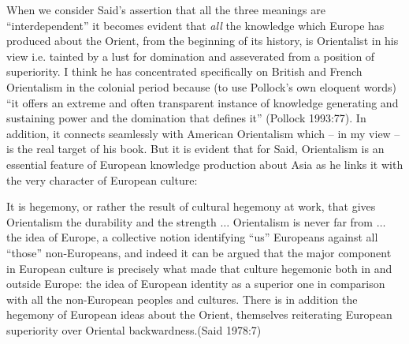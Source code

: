 When we consider Said’s assertion that all the three meanings are “interdependent” it becomes evident that {\sl all} the knowledge which Europe has produced about the Orient, from the beginning of its history, is Orientalist in his view i.e. tainted by a lust for domination and asseverated from a position of superiority. I think he has concentrated specifically on British and French Orientalism in the colonial period because (to use Pollock’s own eloquent words) “it offers an extreme and often transparent instance of knowledge generating and sustaining power and the domination that defines it” (Pollock 1993:77). In addition, it connects seamlessly with American Orientalism which – in my view – is the real target of his book. But it is evident that for Said, Orientalism is an essential feature of European knowledge production about Asia as he links it with the very character of European culture:
\begin{myquote}
It is hegemony, or rather the result of cultural hegemony at work, that gives Orientalism the durability and the strength $\ldots$ Orientalism is never far from $\ldots$ the idea of Europe, a collective notion identifying “us” Europeans against all “those” non-Europeans, and indeed it can be argued that the major component in European culture is precisely what made that culture hegemonic both in and outside Europe: the idea of European identity as a superior one in comparison with all the non-European peoples and cultures. There is in addition the hegemony of European ideas about the Orient, themselves reiterating European superiority over Oriental backwardness.\hfill (Said 1978:7)
\end{myquote}

